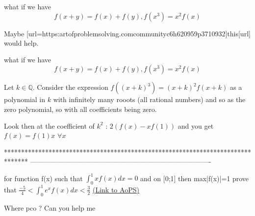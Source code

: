 \begin{solution}
	what if we have $$f(x+y)=f(x)+f(y),f(x^3)=x^2f(x)$$ 
\end{solution}



\begin{solution}
	Maybe [url=https:\/\/artofproblemsolving.com\/community\/c6h620959p3710932]this[\/url] would help.
\end{solution}



\begin{solution}
	\begin{tcolorbox}what if we have $$f(x+y)=f(x)+f(y),f(x^3)=x^2f(x)$$\end{tcolorbox}
Let $k\in\mathbb Q$.
Consider the expression $f((x+k)^3)=(x+k)^2f(x+k)$ as a polynomial in $k$ with infinitely many rooots (all rational numbers) and so as the zero polynomial, so with all coefficients being zero.

Look then at the coefficient of $k^2$ : $2(f(x)-xf(1))$ and you get $f(x)=f(1)x$ $\forall x$



\end{solution}
*******************************************************************************
-------------------------------------------------------------------------------

\begin{problem}
	for function f(x) such that $\int_{0}^{1}xf(x)dx=0$ and on [0;1] then max|f(x)|=1 prove that $\frac{-5}{4}<\int_{0}^{1}e^xf(x)dx<\frac{3}{2}$
	\flushright \href{https://artofproblemsolving.com/community/c7h1633308}{(Link to AoPS)}
\end{problem}



\begin{solution}
	Where pco ? Can you help me
\end{solution}




